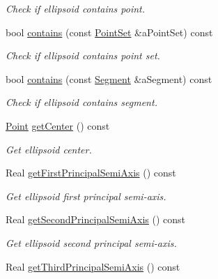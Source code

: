 \begin{DoxyCompactItemize}
\begin{DoxyCompactList}\small\item\em Check if ellipsoid contains point. \end{DoxyCompactList}\item 
bool \hyperlink{classlibrary_1_1math_1_1geom_1_1d3_1_1objects_1_1_ellipsoid_af539fe9e2be122e3f994a48e7d308fd0}{contains} (const \hyperlink{classlibrary_1_1math_1_1geom_1_1d3_1_1objects_1_1_point_set}{Point\+Set} \&a\+Point\+Set) const
\begin{DoxyCompactList}\small\item\em Check if ellipsoid contains point set. \end{DoxyCompactList}\item 
bool \hyperlink{classlibrary_1_1math_1_1geom_1_1d3_1_1objects_1_1_ellipsoid_a4b0c41a41fbd8f158da26825f04c47d5}{contains} (const \hyperlink{classlibrary_1_1math_1_1geom_1_1d3_1_1objects_1_1_segment}{Segment} \&a\+Segment) const
\begin{DoxyCompactList}\small\item\em Check if ellipsoid contains segment. \end{DoxyCompactList}\item 
\hyperlink{classlibrary_1_1math_1_1geom_1_1d3_1_1objects_1_1_point}{Point} \hyperlink{classlibrary_1_1math_1_1geom_1_1d3_1_1objects_1_1_ellipsoid_a646be2506950d250db0fb6610979bb46}{get\+Center} () const
\begin{DoxyCompactList}\small\item\em Get ellipsoid center. \end{DoxyCompactList}\item 
Real \hyperlink{classlibrary_1_1math_1_1geom_1_1d3_1_1objects_1_1_ellipsoid_a8219b05b4c6afcd71e915d10b6129baf}{get\+First\+Principal\+Semi\+Axis} () const
\begin{DoxyCompactList}\small\item\em Get ellipsoid first principal semi-\/axis. \end{DoxyCompactList}\item 
Real \hyperlink{classlibrary_1_1math_1_1geom_1_1d3_1_1objects_1_1_ellipsoid_abdc2cc0bed7d473f0d4f572afd0de054}{get\+Second\+Principal\+Semi\+Axis} () const
\begin{DoxyCompactList}\small\item\em Get ellipsoid second principal semi-\/axis. \end{DoxyCompactList}\item 
Real \hyperlink{classlibrary_1_1math_1_1geom_1_1d3_1_1objects_1_1_ellipsoid_a62b97423985083db726d34eced6b58ae}{get\+Third\+Principal\+Semi\+Axis} () const

\end{DoxyCompactItemize}
